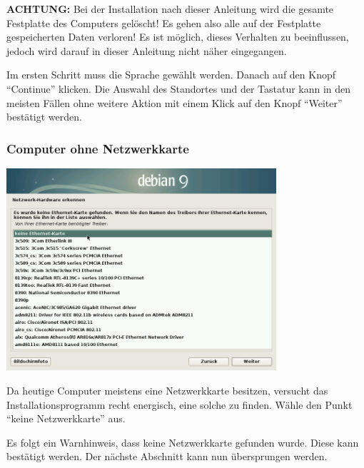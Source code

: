 \documentclass[a4paper,12pt,twoside]{article}
\begin{document}
\textbf{ACHTUNG:} Bei der Installation nach dieser Anleitung wird die gesamte
Festplatte des Computers gelöscht! Es gehen also alle auf der
Festplatte gespeicherten Daten verloren! Es ist möglich, dieses
Verhalten zu beeinflussen, jedoch wird darauf in dieser Anleitung nicht
näher eingegangen.

Im ersten Schritt muss die Sprache gewählt werden. Danach auf den Knopf
"`Continue"' klicken. Die Auswahl des
Standortes und der Tastatur kann in den meisten Fällen ohne weitere
Aktion mit einem Klick auf den Knopf
"`Weiter"' bestätigt werden.


\subsubsection{Computer ohne Netzwerkkarte}
\label{sct:inst_ohne_netzwerk}

\begin{minipage}{\linewidth}
  \centering
  \captionsetup{type=figure}
  \includegraphics[width=10cm]{screenshots/select_network_card.png}
  \label{fig:inst_netzwerkkarte}
\end{minipage}

Da heutige Computer meistens eine Netzwerkkarte besitzen, versucht das
Installationsprogramm recht energisch, eine solche zu finden. Wähle den
Punkt "`keine Netzwerkkarte"' aus.

Es folgt ein Warnhinweis, dass keine Netzwerkkarte gefunden wurde. Diese
kann bestätigt werden. Der nächste Abschnitt kann nun übersprungen
werden.
\end{document}
